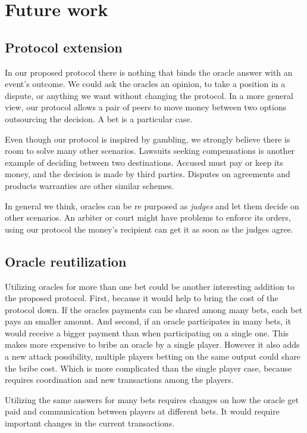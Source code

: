 \section{Future work}
\subsection{Protocol extension}

In our proposed protocol there is nothing that binds the oracle answer with an
  event's outcome.
We could ask the oracles an opinion, to take a position in a dispute, or
  anything we want without changing the protocol.
In a more general view, our protocol allows a pair of peers to move money
  between two options outsourcing the decision.
A bet is a particular case.

Even though our protocol is inspired by gambling, we strongly believe there is
  room to solve many other scenarios.
Lawsuits  seeking compensations is another example of deciding between two
  destinations.
Accused must pay or keep its money, and the decision is made by third parties.
Disputes on agreements and products warranties are other similar schemes.

In general we think, oracles can be re purposed as \textit{judges} and let them
  decide on other scenarios.
An arbiter or court might have problems to enforce its orders, using our
  protocol the money's recipient can get it as soon as the judges agree.

\subsection{Oracle reutilization}
Utilizing oracles for more than one bet could be another interesting addition to
  the proposed protocol.
First, because it would help to bring the cost of the protocol down.
If the oracles payments can be shared among many bets, each bet pays
  an smaller amount.
And second, if an oracle participates in many bets, it would receive a bigger
  payment than when participating on a single one.
This makes more expensive to bribe an oracle by a single player.
However it also adds a new attack possibility, multiple players betting on the
  same output could share the bribe cost.
Which is more complicated than the single player case, because requires
  coordination and new transactions among the players.

Utilizing the same answers for many bets requires changes on how the oracle get
  paid and communication between players at different bets.
It would require important changes in the current transactions.
